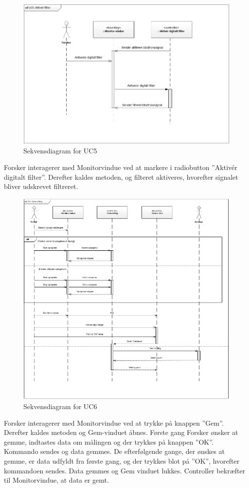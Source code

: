 \begin{figure}[H]
	\centering
	\includegraphics[width=1\textwidth]{Figurer/UC5_SD}
	\caption{Sekvensdiagram for UC5}
\end{figure}

Forsker interagerer med Monitorvindue ved at markere i radiobutton ”Aktivér digitalt filter”. Derefter kaldes metoden, og filteret aktiveres, hvorefter signalet bliver udskrevet filtreret.

\begin{figure}[H]
	\centering
	\includegraphics[width=1\textwidth]{Figurer/UC6_SD}
	\caption{Sekvensdiagram for UC6}
\end{figure}

Forsker interagerer med Monitorvindue ved at trykke på knappen ”Gem”. Derefter kaldes metoden og Gem-vinduet åbnes. Første gang Forsker ønsker at gemme, indtastes data om målingen og der trykkes på knappen ”OK”. Kommando sendes og data gemmes. De efterfølgende gange, der ønskes at gemme, er data udfyldt fra første gang, og der trykkes blot på ”OK”, hvorefter kommandoen sendes. Data gemmes og Gem vinduet lukkes. Controller bekræfter til Monitorvindue, at data er gemt.
